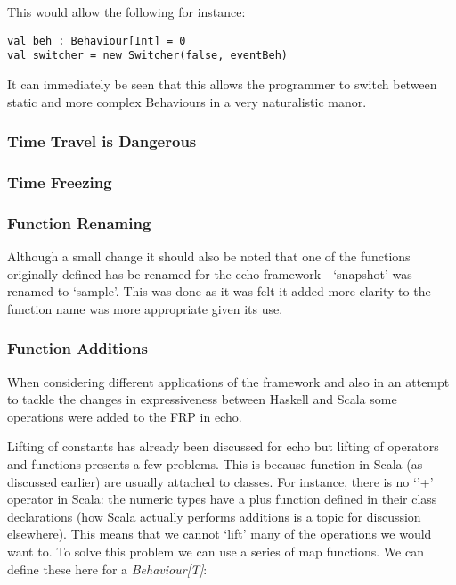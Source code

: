 \documentclass[12pt]{article}
\begin{document}
        This would allow the following for instance:
 
\begin{verbatim}
val beh : Behaviour[Int] = 0
val switcher = new Switcher(false, eventBeh)
\end{verbatim}       

        It can immediately be seen that this allows the programmer to switch between static and more complex
        Behaviours in a very naturalistic manor.
      
      \subsubsection{Time Travel is Dangerous}
        
      \subsubsection{Time Freezing}
      
      \subsubsection{Function Renaming}
        Although a small change it should also be noted that one of the functions originally defined
        has be renamed for the echo framework - `snapshot' was renamed to `sample'. This was done as
        it was felt it added more clarity to the function name was more appropriate given its use.
        
      \subsubsection{Function Additions}
        When considering different applications of the framework and also in an attempt to
        tackle the changes in expressiveness between Haskell and Scala some operations
        were added to the FRP in echo.
        
        Lifting of constants has already been discussed for echo but lifting of operators and
        functions presents a few problems. This is because function in Scala (as discussed earlier)
        are usually attached to classes. For instance, there is no `'+' operator in Scala: the numeric
        types have a plus function defined in their class declarations (how Scala actually performs additions
        is a topic for discussion elsewhere). This means that we cannot `lift' many of the operations we
        would want to. To solve this problem we can use a series of map functions. We can define these
        here for a \emph{Behaviour[T]}:
\end{document}
